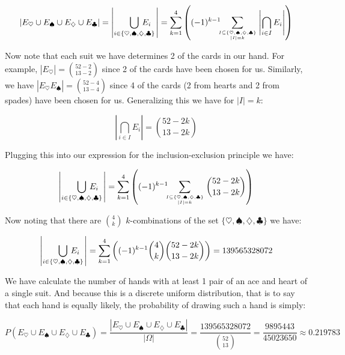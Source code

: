 \documentclass{article}
\begin{document}
\begin{equation*}
    |E_\heartsuit\cup E_\spadesuit\cup E_\diamondsuit\cup E_\clubsuit|=\left|\bigcup_{i\in\{\heartsuit,\spadesuit,\diamondsuit,\clubsuit\}}\mkern-30muE_i\mkern+10mu\right|=\sum_{k=1}^4\left((-1)^{k-1}\mkern-10mu\sum _{I\subseteq \{\heartsuit,\spadesuit,\diamondsuit,\clubsuit\} \atop |I|=k}\left|\bigcap_{i\in I}E_i\right|\right)
\end{equation*}

Now note that each suit we have determines 2 of the cards in our hand. For example, $|E_\heartsuit|=\binom{52-2}{13-2}$ since 2 of the cards have been chosen for us. Similarly, we have $|E_\heartsuit E_\spadesuit|=\binom{52-4}{13-4}$ since 4 of the cards (2 from hearts and 2 from spades) have been chosen for us. Generalizing this we have for $|I|=k$:

\begin{equation*}
    \left|\bigcap_{i\in I}E_i\right|=\binom{52-2k}{13-2k}
\end{equation*}

Plugging this into our expression for the inclusion-exclusion principle we have:

\begin{equation*}
    \left|\bigcup_{i\in\{\heartsuit,\spadesuit,\diamondsuit,\clubsuit\}}\mkern-30muE_i\mkern+10mu\right|=\sum_{k=1}^4\left((-1)^{k-1}\mkern-10mu\sum _{I\subseteq \{\heartsuit,\spadesuit,\diamondsuit,\clubsuit\} \atop |I|=k}\binom{52-2k}{13-2k}\right)
\end{equation*}

Now noting that there are $\binom{4}{k}$ $k$-combinations of the set $\{\heartsuit,\spadesuit,\diamondsuit,\clubsuit\}$ we have:

\begin{equation*}
    \left|\bigcup_{i\in\{\heartsuit,\spadesuit,\diamondsuit,\clubsuit\}}\mkern-30muE_i\mkern+10mu\right|=\sum_{k=1}^4\left((-1)^{k-1}\binom{4}{k}\binom{52-2k}{13-2k}\right)=139565328072
\end{equation*}

We have calculate the number of hands with at least 1 pair of an ace and heart of a single suit. And because this is a discrete uniform distribution, that is to say that each hand is equally likely, the probability of drawing such a hand is simply:

\begin{equation*}
    P(E_\heartsuit\cup E_\spadesuit\cup E_\diamondsuit\cup E_\clubsuit)=\frac{|E_\heartsuit\cup E_\spadesuit\cup E_\diamondsuit\cup E_\clubsuit|}{|\Omega|}=\frac{139565328072}{\binom{52}{13}}=\frac{9895443}{45023650}\approx0.219783
\end{equation*}
\end{document}
